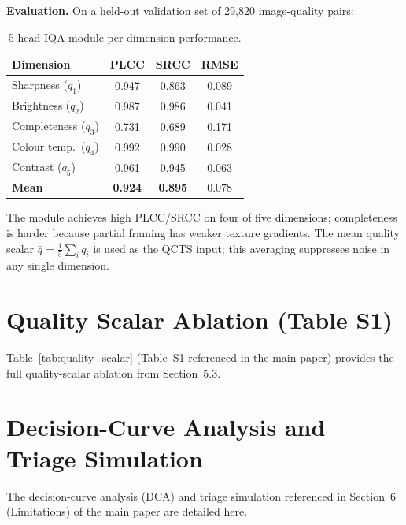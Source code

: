 \documentclass{bmvc2k}
\newcommand{\qbar}{\bar{q}}
\begin{document}
\textbf{Evaluation.}
On a held-out validation set of 29,820 image-quality pairs:

\begin{table}[h]
\centering
\caption{5-head IQA module per-dimension performance.}
\label{tab:iqa_perf}
\begin{tabular}{lccc}
\toprule
Dimension & PLCC & SRCC & RMSE \\
\midrule
Sharpness ($q_1$)        & 0.947 & 0.863 & 0.089 \\
Brightness ($q_2$)       & 0.987 & 0.986 & 0.041 \\
Completeness ($q_3$)     & 0.731 & 0.689 & 0.171 \\
Colour temp.\ ($q_4$)    & 0.992 & 0.990 & 0.028 \\
Contrast ($q_5$)         & 0.961 & 0.945 & 0.063 \\
\midrule
\textbf{Mean}            & \textbf{0.924} & \textbf{0.895} & 0.078 \\
\bottomrule
\end{tabular}
\end{table}

The module achieves high PLCC/SRCC on four of five dimensions; completeness is harder because partial framing has weaker texture gradients. The mean quality scalar $\qbar = \frac{1}{5}\sum_i q_i$ is used as the QCTS input; this averaging suppresses noise in any single dimension.

\section{Quality Scalar Ablation (Table S1)}
\label{app:quality_scalar}

Table~\ref{tab:quality_scalar} (Table~S1 referenced in the main paper) provides the full quality-scalar ablation from Section~5.3.



\section{Decision-Curve Analysis and Triage Simulation}
\label{app:dca}

The decision-curve analysis (DCA) and triage simulation referenced in Section~6 (Limitations) of the main paper are detailed here.
\end{document}
